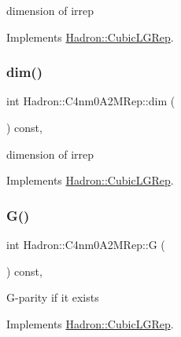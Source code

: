dimension of irrep 

Implements \mbox{\hyperlink{structHadron_1_1CubicLGRep_a3acbaea26503ed64f20df693a48e4cdd}{Hadron\+::\+Cubic\+L\+G\+Rep}}.

\mbox{\label{structHadron_1_1C4nm0A2MRep_a74531346885cc1d3a3b3e7749bfbc5f7}} 
\subsubsection{\texorpdfstring{dim()}{dim()}\hspace{0.1cm}{\footnotesize\ttfamily [2/2]}}
{\footnotesize\ttfamily int Hadron\+::\+C4nm0\+A2\+M\+Rep\+::dim (\begin{DoxyParamCaption}{ }\end{DoxyParamCaption}) const\hspace{0.3cm}{\ttfamily [inline]}, {\ttfamily [virtual]}}

dimension of irrep 

Implements \mbox{\hyperlink{structHadron_1_1CubicLGRep_a3acbaea26503ed64f20df693a48e4cdd}{Hadron\+::\+Cubic\+L\+G\+Rep}}.

\mbox{\label{structHadron_1_1C4nm0A2MRep_a36640a5b382aca709c5523a79cef513f}} 
\subsubsection{\texorpdfstring{G()}{G()}\hspace{0.1cm}{\footnotesize\ttfamily [1/2]}}
{\footnotesize\ttfamily int Hadron\+::\+C4nm0\+A2\+M\+Rep\+::G (\begin{DoxyParamCaption}{ }\end{DoxyParamCaption}) const\hspace{0.3cm}{\ttfamily [inline]}, {\ttfamily [virtual]}}

G-\/parity if it exists 

Implements \mbox{\hyperlink{structHadron_1_1CubicLGRep_ace26f7b2d55e3a668a14cb9026da5231}{Hadron\+::\+Cubic\+L\+G\+Rep}}.

\mbox{\label{structHadron_1_1C4nm0A2MRep_a36640a5b382aca709c5523a79cef513f}} 
